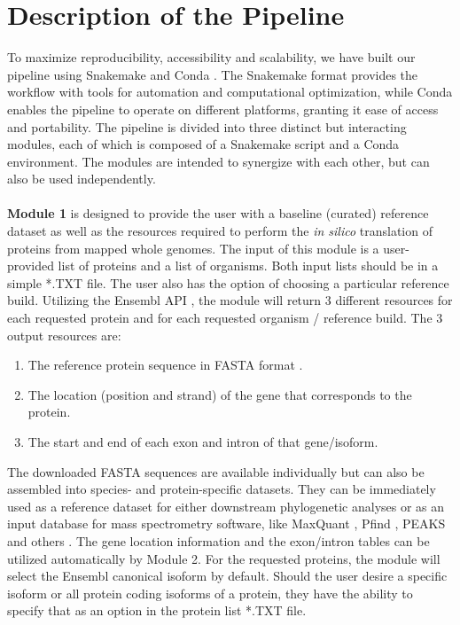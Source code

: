 \documentclass[twocolumn,showpacs,%
  nofootinbib,aps,superscriptaddress,%
  eqsecnum,prd,notitlepage,showkeys,10pt]{report}
\begin{document}
\section{Description of the Pipeline}

To maximize reproducibility, accessibility and scalability, we have built our pipeline using Snakemake \cite{molder2021sustainable} and Conda \cite{anaconda}. The Snakemake format provides the workflow with tools for automation and computational optimization, while Conda enables the pipeline to operate on different platforms, granting it ease of access and portability. The pipeline is divided into three distinct but interacting modules, each of which is composed of a Snakemake script and a Conda environment. The modules are intended to synergize with each other, but can also be used independently.
\paragraph{}

\textbf{Module 1} is designed to provide the user with a baseline (curated) reference dataset as well as the resources required to perform the \textit{in silico} translation of proteins from mapped whole genomes. The input of this module is a user-provided list of proteins and a list of organisms. Both input lists should be in a simple *.TXT file. The user also has the option of choosing a particular reference build. Utilizing the Ensembl API \cite{yates2015ensembl}, the module will return 3 different resources for each requested protein and for each requested organism / reference build. The 3 output resources are:

\begin{enumerate}
\item The reference protein sequence in FASTA format \cite{lipman1985rapid}.
\item The location (position and strand) of the gene that corresponds to the protein.
\item The start and end of each exon and intron of that gene/isoform.
\end{enumerate}

The downloaded FASTA sequences are available individually but can also be assembled into species- and protein-specific datasets. They can be immediately used as a reference dataset for either downstream phylogenetic analyses or as an input database for mass spectrometry software, like MaxQuant \cite{cox2008maxquant}, Pfind \cite{chi2018open}, PEAKS \cite{ma2003peaks} and others \cite{demichev2018dia,kong2017msfragger,solntsev2018enhanced,perkins1999probability}. The gene location information and the exon/intron tables can be utilized automatically by Module 2. For the requested proteins, the module will select the Ensembl canonical isoform by default. Should the user desire a specific isoform or all protein coding isoforms of a protein, they have the ability to specify that as an option in the protein list *.TXT file.
\end{document}

